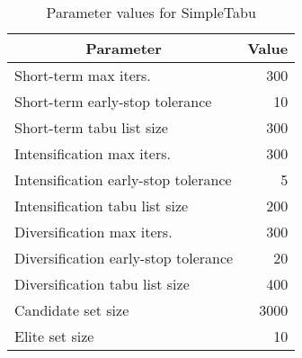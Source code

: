 \begin{table}[]
\centering
\begin{tabular}{|l|r|}
    \hline
    \multicolumn{1}{|c|}{\textbf{Parameter}} & \multicolumn{1}{c|}{\textbf{Value}} \\ \hline
    Short-term max iters. & 300 \\ \hline
    Short-term early-stop tolerance & 10 \\ \hline
    Short-term tabu list size & 300 \\ \hline
    Intensification max iters. & 300 \\ \hline
    Intensification early-stop tolerance & 5 \\ \hline
    Intensification tabu list size & 200 \\ \hline
    Diversification max iters. & 300 \\ \hline
    Diversification early-stop tolerance & 20 \\ \hline
    Diversification tabu list size & 400 \\ \hline
    Candidate set size & 3000 \\ \hline
    Elite set size & 10 \\ \hline
\end{tabular}
\caption{Parameter values for SimpleTabu}
\label{tab:tabu-params}
\end{table}
